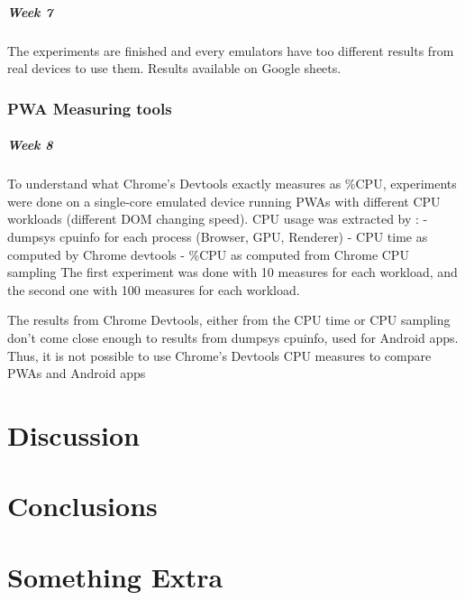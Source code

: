 \documentclass{kththesis}
\begin{document}
\paragraph{Week 7}
The experiments are finished and every emulators have too different results from real devices to use them. 
Results available on Google sheets.

\subsection{PWA Measuring tools}
\paragraph{Week 8}
To understand what Chrome's Devtools exactly measures as \%CPU, experiments were done on a single-core emulated device running PWAs with different CPU workloads (different DOM changing speed). CPU usage was extracted by :
    - dumpsys cpuinfo for each process (Browser, GPU, Renderer)
    - CPU time as computed by Chrome devtools
    - \%CPU as computed from Chrome CPU sampling
The first experiment was done with 10 measures for each workload, and the second one with 100 measures for each workload.

The results from Chrome Devtools, either from the CPU time or CPU sampling don't come close enough to results from dumpsys cpuinfo, used for Android apps. Thus, it is not possible to use Chrome's Devtools CPU measures to compare PWAs and Android apps

\chapter{Discussion}
\blindtext


\chapter{Conclusions}
\blindtext


\listoffigures
\printbibliography[heading=bibintoc]

\appendix

\chapter{Something Extra}

\tailmatter
\end{document}
